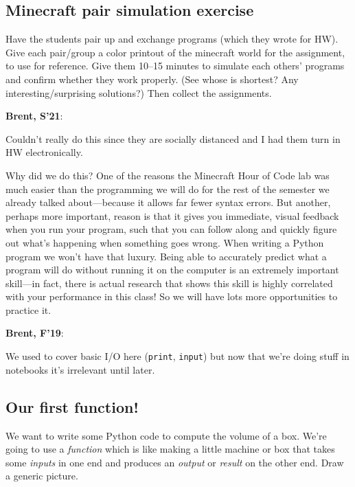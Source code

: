 \documentclass{article}
\newenvironment{reflect}[1]
{
  \noindent
  \begin{lrbox}{\reflectbox}
    \begin{minipage}[t]{\textwidth}
      \textbf{#1}:
}{
    \end{minipage}
  \end{lrbox}
  \fbox{\usebox{\reflectbox}}
}
\begin{document}
\subsection*{Minecraft pair simulation exercise}

Have the students pair up and exchange programs (which they wrote for
HW).  Give each pair/group a color printout of the minecraft world for
the assignment, to use for reference.  Give them 10--15 minutes to
simulate each others' programs and confirm whether they work properly.
(See whose is shortest? Any interesting/surprising solutions?)  Then
collect the assignments.

\begin{reflect}{Brent, S'21}
  Couldn't really do this since they are socially distanced and I had
  them turn in HW electronically.
\end{reflect}

Why did we do this?  One of the reasons the Minecraft Hour of Code lab
was much easier than the programming we will do for the rest of the
semester we already talked about---because it allows far fewer syntax
errors.  But another, perhaps more important, reason is that it gives
you immediate, visual feedback when you run your program, such that
you can follow along and quickly figure out what's happening when
something goes wrong.  When writing a Python program we won't have
that luxury.  Being able to accurately predict what a program will do
without running it on the computer is an extremely important
skill---in fact, there is actual research that shows this skill is
highly correlated with your performance in this class!  So we will
have lots more opportunities to practice it.

\begin{reflect}{Brent, F'19}
  We used to cover basic I/O here (\texttt{print}, \texttt{input}) but
  now that we're doing stuff in notebooks it's irrelevant until later.
\end{reflect}

\subsection*{Our first function!}

We want to write some Python code to compute the volume of a box.
We're going to use a \emph{function} which is like making a little
machine or box that takes some \emph{inputs} in one end and produces
an \emph{output} or \emph{result} on the other end.  Draw a generic
picture.
\end{document}

